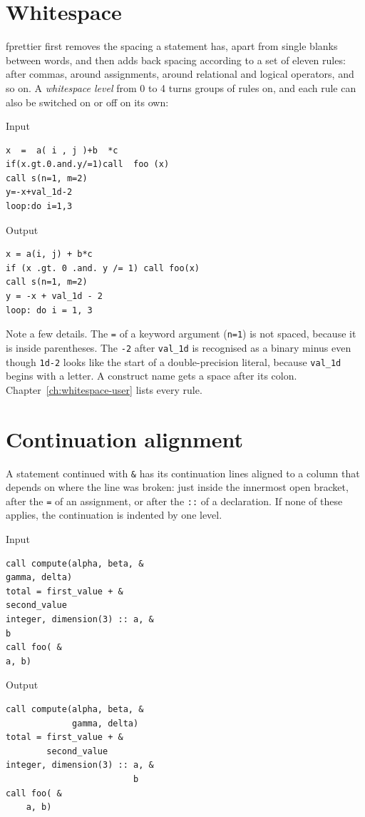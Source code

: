 \documentclass[11pt,a4paper,openany]{book}
\newcommand{\code}[1]{\texttt{\small #1}}
\newenvironment{beforecol}{\noindent\begin{minipage}[t]{0.485\linewidth}\textsf{\footnotesize\color{commentc}Input}}{\end{minipage}\hfill}
\newenvironment{aftercol}{\begin{minipage}[t]{0.485\linewidth}\textsf{\footnotesize\color{commentc}Output}}{\end{minipage}\par\medskip}
\begin{document}
\section{Whitespace}

fprettier first removes the spacing a statement has, apart from single
blanks between words, and then adds back spacing according to a set of eleven
rules: after commas, around assignments, around relational and logical
operators, and so on. A \emph{whitespace level} from 0 to 4 turns groups of rules
on, and each rule can also be switched on or off on its own:

\begin{beforecol}
\begin{lstlisting}[style=before]
x  =  a( i , j )+b  *c
if(x.gt.0.and.y/=1)call  foo (x)
call s(n=1, m=2)
y=-x+val_1d-2
loop:do i=1,3
\end{lstlisting}
\end{beforecol}
\begin{aftercol}
\begin{lstlisting}[style=after]
x = a(i, j) + b*c
if (x .gt. 0 .and. y /= 1) call foo(x)
call s(n=1, m=2)
y = -x + val_1d - 2
loop: do i = 1, 3
\end{lstlisting}
\end{aftercol}

Note a few details. The \code{=} of a keyword argument (\code{n=1}) is not
spaced, because it is inside parentheses. The \code{-2} after \code{val\_1d} is
recognised as a binary minus even though \code{1d-2} looks like the start of a
double-precision literal, because \code{val\_1d} begins with a letter. A
construct name gets a space after its colon. Chapter~\ref{ch:whitespace-user}
lists every rule.

\section{Continuation alignment}

A statement continued with \code{\&} has its continuation lines aligned to a
column that depends on where the line was broken: just inside the innermost
open bracket, after the \code{=} of an assignment, or after the \code{::} of a
declaration. If none of these applies, the continuation is indented by one
level.

\begin{beforecol}
\begin{lstlisting}[style=before]
call compute(alpha, beta, &
gamma, delta)
total = first_value + &
second_value
integer, dimension(3) :: a, &
b
call foo( &
a, b)
\end{lstlisting}
\end{beforecol}
\begin{aftercol}
\begin{lstlisting}[style=after]
call compute(alpha, beta, &
             gamma, delta)
total = first_value + &
        second_value
integer, dimension(3) :: a, &
                         b
call foo( &
    a, b)
\end{lstlisting}
\end{aftercol}
\end{document}
